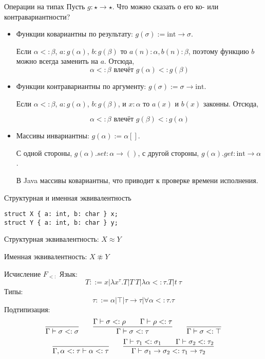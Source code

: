 \documentclass[aspectratio=169,dvipsnames,usenames]{beamer}
\begin{document}
\begin{frame}{Операции на типах}
Пусть $g : \star \rightarrow \star$. Что можно сказать о его ко- или контравариантности?

\begin{itemize}
\item Функции ковариантны по результату: $g(\sigma) := \text{int}\rightarrow\sigma$. 

Если $\alpha <: \beta$, $a : g(\alpha)$, $b : g(\beta)$ то $a(n): \alpha, b(n): \beta$, 
поэтому функцию $b$ можно всегда заменить на $a$. Отсюда,
$$\alpha <: \beta \text{ влечёт } g(\alpha) <: g(\beta)$$

\item Функции контравариантны по аргументу: $g(\sigma) := \sigma\rightarrow\text{int}$. 

Если $\alpha <: \beta$, $a : g(\alpha)$, $b : g(\beta)$, и $x : \alpha$ то
$a(x)$ и $b(x)$ законны. Отсюда,

$$\alpha <: \beta \text{ влечёт } g(\beta) <: g(\alpha)$$

\item Массивы инвариантны: $g(\alpha) := \alpha[]$.

С одной стороны, $g(\alpha).set : \alpha \rightarrow ()$, с другой стороны, $g(\alpha).get : \text{int} \rightarrow \alpha$.

В Java массивы ковариантны, что приводит к проверке времени исполнения.

\end{itemize}
\end{frame}

\begin{frame}[fragile]{Структурная и именная эквивалентность}
\begin{verbatim}
struct X { a: int, b: char } x;
struct Y { a: int, b: char } y;
\end{verbatim}

Структурная эквивалентность: $X \approx Y$

Именная эквивалентность: $X \not\approx Y$

\end{frame}

\begin{frame}{Исчисление $F_{<:}$}
Язык:
$$ T ::= x | \lambda x^\tau.T | T\ T | \lambda \alpha<:\tau.T| t\ \tau$$
Типы:
$$ \tau ::= \alpha|\top|\tau\rightarrow\tau|\forall\alpha<:\tau.\tau$$
Подтипизация:
$$\infer{\Gamma\vdash\sigma<:\sigma}{}\quad\quad\infer{\Gamma\vdash\sigma<:\tau}{\Gamma\vdash\sigma<:\rho\quad\quad\Gamma\vdash\rho<:\tau}\quad\quad\infer{\Gamma\vdash\sigma<:\top}{}$$
$$\infer{\Gamma,\alpha<:\tau\vdash\alpha<:\tau}{}\quad\quad\infer{\Gamma\vdash\sigma_1\rightarrow\sigma_2<:\tau_1\rightarrow\tau_2}{\Gamma\vdash\tau_1<:\sigma_1\quad\quad\Gamma\vdash\sigma_2<:\tau_2}$$


\end{frame}
\end{document}
